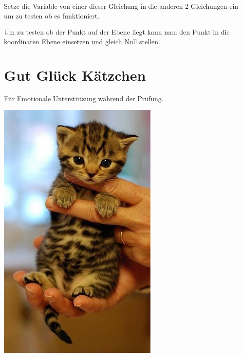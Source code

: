 \begin{multicols}{2}
    Setze die Variable von einer dieser Gleichung in die anderen 2 Gleichungen ein um zu testen ob es funktioniert.

    Um zu testen ob der Punkt auf der Ebene liegt kann man den Punkt in die koordinaten Ebene einsetzen und gleich Null stellen.
    \section{Gut Glück Kätzchen}
    Für Emotionale Unterstützung während der Prüfung.


    \begin{center}
        \includegraphics[scale=0.7]{veryimportant.png}
    \end{center}


    \newpage
\end{multicols}